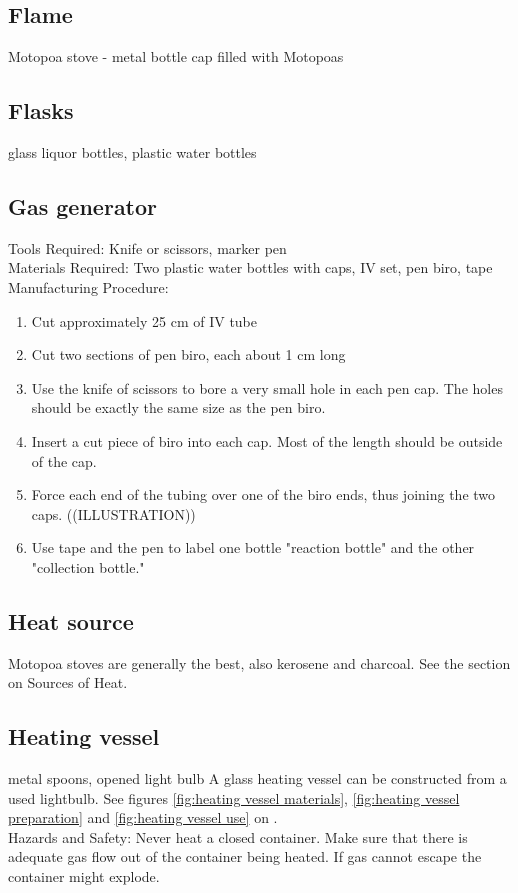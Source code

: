 \subsection*{Flame}
Motopoa stove - metal bottle cap filled with Motopoas

\subsection*{Flasks}
glass liquor bottles, plastic water bottles

\subsection*{Gas generator}
Tools Required: Knife or scissors, marker pen\\
Materials Required: Two plastic water bottles with caps, IV set, pen biro, tape\\
Manufacturing Procedure:
\begin{enumerate}
\item{Cut approximately 25 cm of IV tube}
\item{Cut two sections of pen biro, each about 1 cm long}
\item{Use the knife of scissors to bore a very small hole in each pen cap. The holes should be exactly the same size as the pen biro.}
\item{Insert a cut piece of biro into each cap. Most of the length should be outside of the cap.}
\item{Force each end of the tubing over one of the biro ends, thus joining the two caps. ((ILLUSTRATION))}
\item{Use tape and the pen to label one bottle "reaction bottle" and the other "collection bottle."}
\end{enumerate}

\subsection*{Heat source}
Motopoa stoves are generally the best, also kerosene and charcoal. See the section on Sources of Heat.

\subsection*{Heating vessel}
metal spoons, opened light bulb
A glass heating vessel can be constructed from a used lightbulb. See figures \ref{fig:heating vessel materials}, \ref{fig:heating vessel preparation} and \ref{fig:heating vessel use} on \pageref{fig:heating vessel use}.\\
Hazards and Safety: Never heat a closed container. Make sure that there is adequate gas flow out of the container being heated. If gas cannot escape the container might explode.

